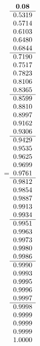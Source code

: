 =\hbox{$\begin{array}{c}
\bf 0.08 
 \\ \hline 
  0.5319 \\ 
  0.5714 \\ 
  0.6103 \\ 
  0.6480 \\ 
  0.6844
 \\ \hline 
  0.7190 \\ 
  0.7517 \\ 
  0.7823 \\ 
  0.8106 \\ 
  0.8365
 \\ \hline 
  0.8599 \\ 
  0.8810 \\ 
  0.8997 \\ 
  0.9162 \\ 
  0.9306
 \\ \hline 
  0.9429 \\ 
  0.9535 \\ 
  0.9625 \\ 
  0.9699 \\ 
  0.9761
 \\ \hline 
  0.9812 \\ 
  0.9854 \\ 
  0.9887 \\ 
  0.9913 \\ 
  0.9934
 \\ \hline 
  0.9951 \\ 
  0.9963 \\ 
  0.9973 \\ 
  0.9980 \\ 
  0.9986
 \\ \hline 
  0.9990 \\ 
  0.9993 \\ 
  0.9995 \\ 
  0.9996 \\ 
  0.9997
 \\ \hline 
  0.9998 \\ 
  0.9999 \\ 
  0.9999 \\ 
  0.9999 \\ 
  1.0000
 \end{array}$}
